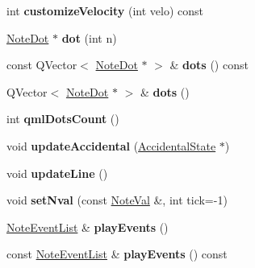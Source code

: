 \begin{DoxyCompactItemize}
\item 
\mbox{\label{class_ms_1_1_note_afede42365ed2f8a3586db49d9bab5ee3}} 
int {\bfseries customize\+Velocity} (int velo) const
\item 
\mbox{\label{class_ms_1_1_note_afb3876cd44a8beb14ac32a895c885428}} 
\hyperlink{class_ms_1_1_note_dot}{Note\+Dot} $\ast$ {\bfseries dot} (int n)
\item 
\mbox{\label{class_ms_1_1_note_a48f11d8f23219b2595615d501b630bc1}} 
const Q\+Vector$<$ \hyperlink{class_ms_1_1_note_dot}{Note\+Dot} $\ast$ $>$ \& {\bfseries dots} () const
\item 
\mbox{\label{class_ms_1_1_note_a87e3d4c6937d4c67bf3df703a07ddb7c}} 
Q\+Vector$<$ \hyperlink{class_ms_1_1_note_dot}{Note\+Dot} $\ast$ $>$ \& {\bfseries dots} ()
\item 
\mbox{\label{class_ms_1_1_note_abb36d80d537ebc0ff5247c022901dd2d}} 
int {\bfseries qml\+Dots\+Count} ()
\item 
\mbox{\label{class_ms_1_1_note_a59e4af122333f6e794ba9a30340a3584}} 
void {\bfseries update\+Accidental} (\hyperlink{class_ms_1_1_accidental_state}{Accidental\+State} $\ast$)
\item 
\mbox{\label{class_ms_1_1_note_ae437265e0c8f4a19d786ee2f66ad3723}} 
void {\bfseries update\+Line} ()
\item 
\mbox{\label{class_ms_1_1_note_a31dcf8756da26052a3248b9837b93737}} 
void {\bfseries set\+Nval} (const \hyperlink{struct_ms_1_1_note_val}{Note\+Val} \&, int tick=-\/1)
\item 
\mbox{\label{class_ms_1_1_note_a4bcf5d2a9e8fc31a5b4c4fffbab51924}} 
\hyperlink{class_ms_1_1_note_event_list}{Note\+Event\+List} \& {\bfseries play\+Events} ()
\item 
\mbox{\label{class_ms_1_1_note_a7f9817aa0fa956d8b132072a358bdadd}} 
const \hyperlink{class_ms_1_1_note_event_list}{Note\+Event\+List} \& {\bfseries play\+Events} () const
\item 

\end{DoxyCompactItemize}
